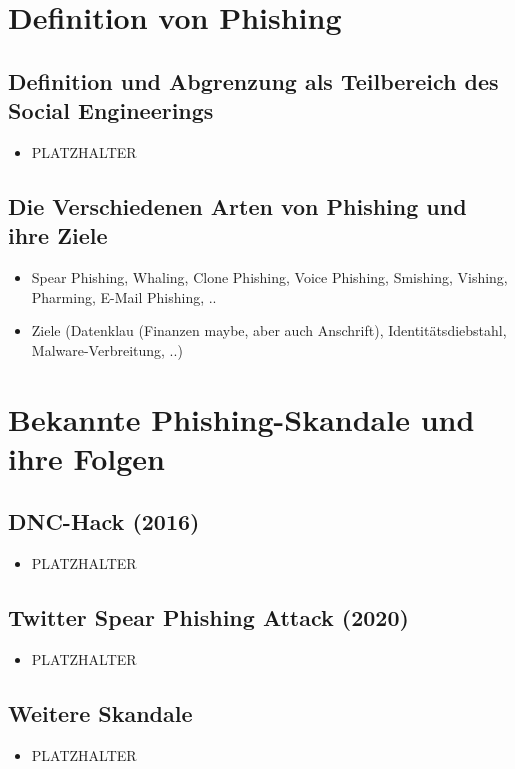 \documentclass[12pt, a4paper, oneside]{scrartcl}
\begin{document}
\section{Definition von Phishing}

\subsection{Definition und Abgrenzung als Teilbereich des Social Engineerings}
\begin{itemize}
  \item PLATZHALTER
\end{itemize}


\subsection{Die Verschiedenen Arten von Phishing und ihre Ziele}
\begin{itemize}
  \item Spear Phishing, Whaling, Clone Phishing, Voice Phishing, Smishing, Vishing, Pharming, E-Mail Phishing, ..
  \item Ziele (Datenklau (Finanzen maybe, aber auch Anschrift), Identitätsdiebstahl, Malware-Verbreitung, ..)
\end{itemize}

\section{Bekannte Phishing-Skandale und ihre Folgen}

\subsection{DNC-Hack (2016)}
\begin{itemize}
  \item PLATZHALTER
\end{itemize}

\subsection{Twitter Spear Phishing Attack (2020)}
\begin{itemize}
  \item PLATZHALTER
\end{itemize}

\subsection{Weitere Skandale}
\begin{itemize}
  \item PLATZHALTER
\end{itemize}
\end{document}
